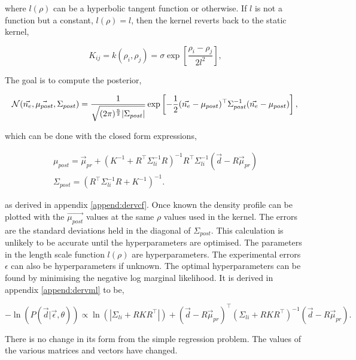 \noindent where $l(\rho)$ can be a hyperbolic tangent function or otherwise. If $l$ is not a function but a constant, $l(\rho) = l$, then the kernel reverts back to the static kernel,

\begin{equation}
K_{ij} = k(\rho_i, \rho_j) = \sigma \exp\left[{\frac{\rho_i - \rho_j}{2l^2}}\right],
\end{equation}
  
\noindent The goal is to compute the posterior,

\begin{equation}
\mathcal{N}(\vec{n_e}, \vec{\mu_{post}}, \Sigma_{post}) = \frac{1}{\sqrt{(2\pi)^{\frac{n}{2}}|\Sigma_{post}|}} \exp \left[{{-\frac{1}{2}(\vec{n_e}-\mu_{post})^\top\Sigma_{post}^{-1}(\vec{n_e}-\mu_{post})}}\right],\\
\end{equation}

\noindent which can be done with the closed form expressions,

\begin{gather}
    \mu_{post}= \vec{\mu}_{pr} + (K^{-1} + R^{\top} \Sigma_{li}^{-1} R)^{-1} R^{\top} \Sigma_{li}^{-1} (\vec{d} - R \vec{\mu}_{pr})\\
    \Sigma_{post} = \left(R^\top \Sigma_{li}^{-1} R + K^{-1}\right)^{-1}.
\end{gather}

\noindent as derived in appendix \ref{append:dervcf}. Once known the density profile can be plotted with the $\vec{\mu_{post}}$ values at the same $\rho$ values used in the kernel. The errors are the standard deviations held in the diagonal of $\Sigma_{post}$. This calculation is unlikely to be accurate until the hyperparameters are optimised. The parameters in the length scale function $l(\rho)$ are hyperparameters. The experimental errors $\epsilon$ can also be hyperparameters if unknown. The optimal hyperparameters can be found by minimising the negative log marginal likelihood. It is derived in appendix \ref{append:dervml} to be, 

\begin{equation}
-\ln(P(\vec d| \vec \epsilon,\theta)) \propto \ln(|\Sigma_{li}+RKR^\top|) + (\vec{d} - R\vec{\mu}_{pr})^{\top} (\Sigma_{li} + R K R^{\top})^{-1} (\vec{d} - R\vec{\mu}_{pr}).
\end{equation}

\noindent There is no change in its form from the simple regression problem. The values of the various matrices and vectors have changed. 

